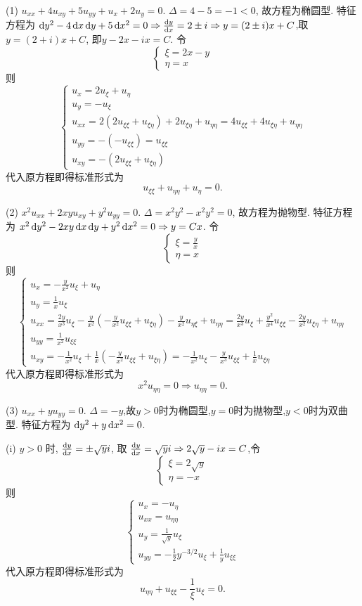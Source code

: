\begin{solve}
  (1) $u_{xx}+4u_{xy}+5u_{yy}+u_x+2u_y=0$.
  $\Delta=4-5=-1<0$, 故方程为椭圆型.
  特征方程为 $\mathop{}\!\mathrm{d} y^2-4\mathop{}\!\mathrm{d} x\mathop{}\!\mathrm{d} y+5\mathop{}\!\mathrm{d} x^2=0\Rightarrow\frac{\mathop{}\!\mathrm{d} y}{\mathop{}\!\mathrm{d} x}=2\pm i\Rightarrow y=(2\pm i)x+C$,取$y=(2+i)x+C$, 即$y-2x-ix=C$. 令
  \[\begin{cases}
  \xi=2x-y\\\eta=x
  \end{cases}\]
  则\[\begin{cases}
  u_x=2u_{\xi}+u_{\eta}\\
  u_y=-u_{\xi}\\
  u_{xx}=2(2u_{\xi\xi}+u_{\xi\eta})+2u_{\xi\eta}+u_{\eta\eta}=4u_{\xi\xi}+4u_{\xi\eta}+u_{\eta\eta}\\
  u_{yy}=-(-u_{\xi\xi})=u_{\xi\xi}\\
  u_{xy}=-(2u_{\xi\xi}+u_{\xi\eta})
  \end{cases}\]
  代入原方程即得标准形式为
  \[u_{\xi\xi}+u_{\eta\eta}+u_{\eta} = 0.\]

  (2) $x^2u_{xx}+2xyu_{xy}+y^2u_{yy}=0$.
  $\Delta=x^2y^2-x^2y^2=0$, 故方程为抛物型.
  特征方程为 $x^2\mathop{}\!\mathrm{d} y^2-2xy\mathop{}\!\mathrm{d} x\mathop{}\!\mathrm{d} y+y^2\mathop{}\!\mathrm{d} x^2=0\Rightarrow y=Cx$. 令
  \[\begin{cases}
  \xi=\frac{y}{x}\\\eta=x
  \end{cases}\]
  则\[\begin{cases}
  u_x=-\frac{y}{x^2}u_{\xi}+u_{\eta}\\
  u_y=\frac{1}{x}u_{\xi}\\
  u_{xx}=\frac{2y}{x^3}u_{\xi}-\frac{y}{x^2}\left(-\frac{y}{x^2}u_{\xi\xi}+u_{\xi\eta}\right)-\frac{y}{x^2}u_{\eta\xi}+u_{\eta\eta}=\frac{2y}{x^3}u_{\xi}+\frac{y^2}{x^4}u_{\xi\xi}-\frac{2y}{x^2}u_{\xi\eta}+u_{\eta\eta}\\
  u_{yy}=\frac{1}{x^2}u_{\xi\xi}\\
  u_{xy}=-\frac{1}{x^2}u_{\xi}+\frac{1}{x}\left(-\frac{y}{x^2}u_{\xi\xi}+u_{\xi\eta}\right)=-\frac{1}{x^2}u_{\xi}-\frac{y}{x^3}u_{\xi\xi}+\frac{1}{x}u_{\xi\eta}
  \end{cases}\]
  代入原方程即得标准形式为
  \[x^2u_{\eta\eta}=0\Rightarrow u_{\eta\eta} = 0.\]

  (3) $u_{xx}+yu_{yy}=0$.
  $\Delta=-y$,故$y>0$时为椭圆型,$y=0$时为抛物型,$y<0$时为双曲型.
  特征方程为 $\mathop{}\!\mathrm{d} y^2+y\mathop{}\!\mathrm{d} x^2=0$.

  (i) $y>0$ 时, $\frac{\mathop{}\!\mathrm{d} y}{\mathop{}\!\mathrm{d} x}=\pm\sqrt{y}i$,
  取 $\frac{\mathop{}\!\mathrm{d} y}{\mathop{}\!\mathrm{d} x}=\sqrt{y}i\Rightarrow 2\sqrt{y}-ix=C$,令
  \[\begin{cases}
  \xi=2\sqrt{y}\\\eta=-x
  \end{cases}\]
  则\[\begin{cases}
  u_x=-u_{\eta}\\
  u_{xx}=u_{\eta\eta}\\
  u_{y}=\frac{1}{\sqrt{y}}u_{\xi}\\
  u_{yy}=-\frac{1}{2}y^{-3/2}u_{\xi}+\frac{1}{y}u_{\xi\xi}
  \end{cases}\]
  代入原方程即得标准形式为
  \[u_{\eta\eta}+u_{\xi\xi}-\frac{1}{\xi}u_{\xi} = 0.\]


\end{solve}
